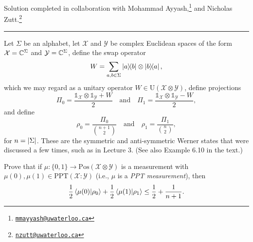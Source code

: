 \documentclass[boxes,pages,color=SeaGreen]{homework}
\newcommand{\collab}[1]{\footnote{\href{mailto:#1}{\texttt{#1}}}}
\newcommand{\X}{\mathcal{X}}
\newcommand{\Y}{\mathcal{Y}}
\newcommand{\I}{\mathbb{1}}
\newcommand{\Pos}{\mathrm{Pos}}
\newcommand{\Unitary}{\mathrm{U}}
\newcommand{\PPT}{\mathrm{PPT}}
\begin{document}
\noindent Solution completed in collaboration with Mohammad Ayyash,\collab{mmayyash@uwaterloo.ca} and Nicholas Zutt.\collab{nzutt@uwaterloo.ca}

{\noindent\color{SeaGreen!30}\rule{\textwidth}{1.5pt}}

\begin{solution}
\end{solution}

\begin{problem}
Let $\Sigma$ be an alphabet, let $\X$ and $\Y$ be complex Euclidean spaces of
the form $\X = \C^{\Sigma}$ and $\Y = \C^{\Sigma}$, define the
swap operator
\[
  W = \sum_{a,b\in\Sigma} \ketbra{a}{b} \otimes \ketbra{b}{a},
\]
which we may regard as a unitary operator $W\in\Unitary(\X\otimes\Y)$,
define projections
\[
  \Pi_0 = \frac{\I_{\X} \otimes \I_{\Y} + W}{2}
  \quad\text{and}\quad
  \Pi_1 = \frac{\I_{\X} \otimes \I_{\Y} - W}{2},
\]
and define
\[
  \rho_0 = \frac{\Pi_0}{\binom{n+1}{2}}
  \quad\text{and}\quad
  \rho_1 = \frac{\Pi_1}{\binom{n}{2}},
\]
for $n = \abs{\Sigma}$.
These are the symmetric and anti-symmetric Werner states that were discussed
a few times, such as in Lecture 3.
(See also Example 6.10 in the text.)

Prove that if $\mu: \{0,1\} \rightarrow \Pos(\X\otimes\Y)$ is a measurement with
$\mu(0), \mu(1) \in \PPT(\X \mathbin{:} \Y)$ (i.e., $\mu$ is a
\emph{PPT measurement}), then
\[
  \frac{1}{2}\ip{\mu(0)}{\rho_0} + \frac{1}{2}\ip{\mu(1)}{\rho_1}
  \leq \frac{1}{2} + \frac{1}{n+1}.
\]
\end{problem}
\end{document}
